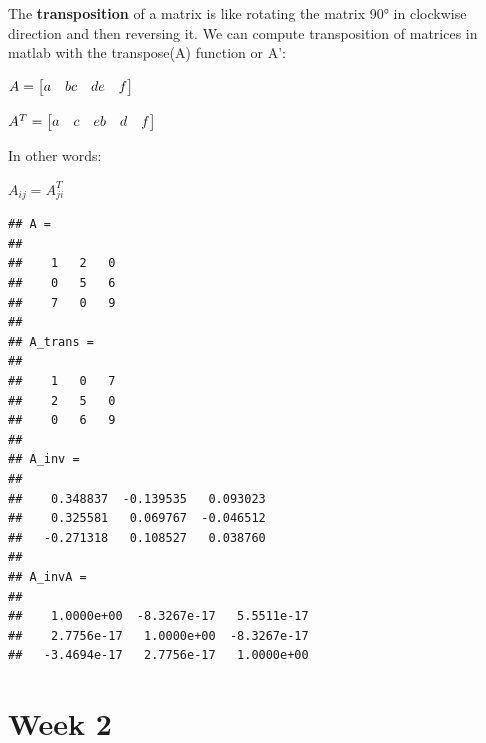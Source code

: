 \documentclass[
]{book}
\newenvironment{Shaded}{\begin{snugshade}}{\end{snugshade}}
\newcommand{\CommentTok}[1]{\textcolor[rgb]{0.56,0.35,0.01}{\textit{#1}}}
\newcommand{\FloatTok}[1]{\textcolor[rgb]{0.00,0.00,0.81}{#1}}
\newcommand{\FunctionTok}[1]{\textcolor[rgb]{0.00,0.00,0.00}{#1}}
\newcommand{\NormalTok}[1]{#1}
\newcommand{\OperatorTok}[1]{\textcolor[rgb]{0.81,0.36,0.00}{\textbf{#1}}}
\begin{document}
The \textbf{transposition} of a matrix is like rotating the matrix 90° in clockwise direction and then reversing it. We can compute transposition of matrices in matlab with the transpose(A) function or A':

\(A = \begin{bmatrix} a & b \newline c & d \newline e & f \end{bmatrix}\)

\(A^T = \begin{bmatrix} a & c & e \newline b & d & f \newline \end{bmatrix}\)

In other words:

\(A_{ij} = A^T_{ji}\)

\begin{Shaded}
\end{Shaded}

\begin{verbatim}
## A =
## 
##    1   2   0
##    0   5   6
##    7   0   9
## 
## A_trans =
## 
##    1   0   7
##    2   5   0
##    0   6   9
## 
## A_inv =
## 
##    0.348837  -0.139535   0.093023
##    0.325581   0.069767  -0.046512
##   -0.271318   0.108527   0.038760
## 
## A_invA =
## 
##    1.0000e+00  -8.3267e-17   5.5511e-17
##    2.7756e-17   1.0000e+00  -8.3267e-17
##   -3.4694e-17   2.7756e-17   1.0000e+00
\end{verbatim}

\hypertarget{week-2}{%
\chapter{Week 2}\label{week-2}}
\end{document}
